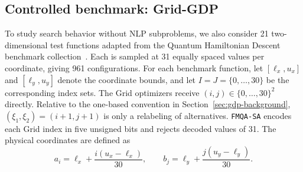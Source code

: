 \documentclass{article}
\begin{document}
\subsection{Controlled benchmark: Grid-GDP}
\label{sec:grid-gdp-formulation}
To study search behavior without NLP subproblems, we also consider 21 two-dimensional test functions adapted from the Quantum Hamiltonian Descent benchmark collection~\citep{qhdBenchmarks}.
Each is sampled at 31 equally spaced values per coordinate, giving 961 configurations.
For each benchmark function, let \([\ell_x,u_x]\) and \([\ell_y,u_y]\) denote the coordinate bounds, and let \(I=J=\{0,\ldots,30\}\) be the corresponding index sets.
The Grid optimizers receive \((i,j)\in\{0,\ldots,30\}^{2}\) directly.
Relative to the one-based convention in Section~\ref{sec:gdp-background}, \((\xi_1,\xi_2)=(i+1,j+1)\) is only a relabeling of alternatives.
\texttt{FMQA-SA} encodes each Grid index in five unsigned bits and rejects decoded values of 31.
The physical coordinates are defined as
\begin{equation}\label{eqn:grid-coordinates}
a_i=\ell_x+\frac{i(u_x-\ell_x)}{30},\qquad
b_j=\ell_y+\frac{j(u_y-\ell_y)}{30}.
\end{equation}
\end{document}
